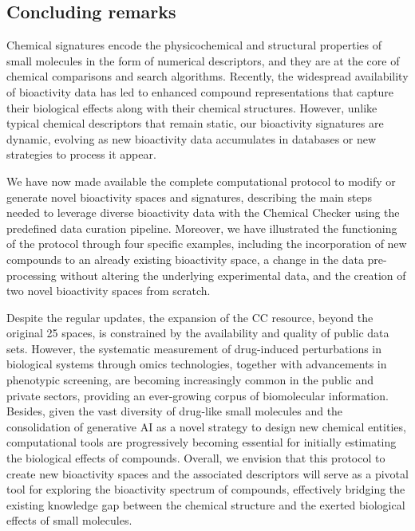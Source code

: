 \subsection{Concluding remarks}

Chemical signatures encode the physicochemical and structural properties of small molecules in the form of numerical descriptors, and they are at the core of chemical comparisons and search algorithms\cite{fernandez-torras_connecting_2022}. Recently, the widespread availability of bioactivity data has led to enhanced compound representations that capture their biological effects along with their chemical structures. However, unlike typical chemical descriptors that remain static, our bioactivity signatures are dynamic, evolving as new bioactivity data accumulates in databases or new strategies to process it appear.

We have now made available the complete computational protocol to modify or generate novel bioactivity spaces and signatures, describing the main steps needed to leverage diverse bioactivity data with the Chemical Checker using the predefined data curation pipeline. Moreover, we have illustrated the functioning of the protocol through four specific examples, including the incorporation of new compounds to an already existing bioactivity space, a change in the data pre-processing without altering the underlying experimental data, and the creation of two novel bioactivity spaces from scratch. 

Despite the regular updates, the expansion of the CC resource, beyond the original 25 spaces, is constrained by the availability and quality of public data sets. However, the systematic measurement of drug-induced perturbations in biological systems through omics technologies, together with advancements in phenotypic screening, are becoming increasingly common in the public and private sectors, providing an ever-growing corpus of biomolecular information. Besides, given the vast diversity of drug-like small molecules and the consolidation of generative AI as a novel strategy to design new chemical entities, computational tools are progressively becoming essential for initially estimating the biological effects of compounds. Overall, we envision that this protocol to create new bioactivity spaces and the associated descriptors will serve as a pivotal tool for exploring the bioactivity spectrum of compounds, effectively bridging the existing knowledge gap between the chemical structure and the exerted biological effects of small molecules.
